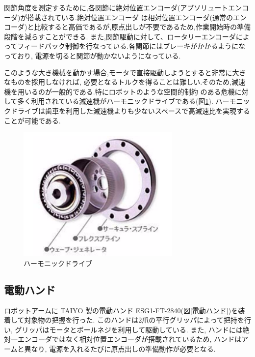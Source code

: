 \documentclass[a4paper,11pt]{jsarticle}
\begin{document}
\par
関節角度を測定するために,各関節に絶対位置エンコーダ(アブソリュートエンコーダ)が搭載されている.絶対位置エンコーダ
は相対位置エンコーダ(通常のエンコーダ)と比較すると高価であるが,原点出しが不要であるため,作業開始時の準備段階を減らすことができる.
また,関節駆動に対して、ロータリーエンコーダによってフィードバック制御を行なっている.各関節にはブレーキがかかるようになっており,
電源を切ると関節が動かないようになっている.
\par
このような大き機械を動かす場合,モータで直接駆動しようとすると非常に大きなものを採用しなければ,
必要となるトルクを得ることは難しい.そのため,減速機を用いるのが一般的である.特にロボットのような空間的制約
のある危機に対して多く利用されている減速機がハーモニックドライブである(図\ref{ハーモニックドライブ}).
ハーモニックドライブは歯車を利用した減速機よりも少ないスペースで高減速比を実現することが可能である.
\begin{figure}[H]
  \begin{center}
    \includegraphics[width = 8cm]{画像/ハーモニックドライブ.png}
    \caption{ハーモニックドライブ}
    \label{ハーモニックドライブ}
  \end{center}
\end{figure}

\subsection{電動ハンド}
ロボットアームに TAIYO 製の電動ハンド ESG1-FT-2840(図\ref{電動ハンド})を装着して対象物の把握を行った.
このハンドは2爪の平行グリッパによって把持を行い, グリッパはモータとボールネジを利用して駆動している.
また, ハンドには絶対一エンコーダではなく相対位置エンコーダが搭載されているため, ハンドはアームと異なり, 電源を入れるたびに原点出しの準備動作が必要となる.
\end{document}
